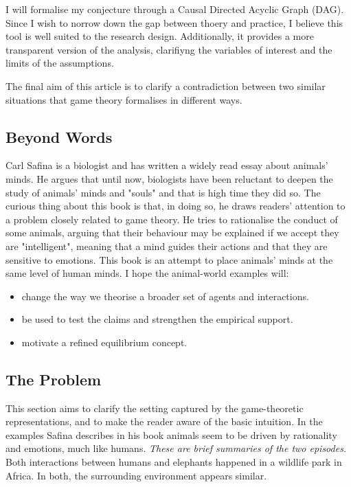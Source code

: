 \vspace*{1em}
I will formalise my conjecture through a Causal Directed Acyclic Graph (DAG). Since I wish to norrow down the gap between thoery and practice, I believe this tool is well suited to the research design. Additionally, it provides a more transparent version of the analysis, clarifiyng the variables of interest and the limits of the assumptions.

\vspace*{1em}
The final aim of this article is to clarify a contradiction between two similar situations that game theory formalises in different ways.


\subsection{Beyond Words}
Carl Safina is a biologist and has written a widely read essay \parencite{safinaWordsWhatAnimals2015} about animals' minds. He argues that until now, biologists have been reluctant to deepen the study of animals' minds and "souls" and that is high time they did so. The curious thing about this book is that, in doing so, he draws readers' attention to a problem closely related to game theory.
He tries to rationalise the conduct of some animals, arguing that their behaviour may be explained if we accept they are "intelligent", meaning that a mind guides their actions and that they are sensitive to emotions. This book is an attempt to place animals' minds at the same level of human minds.
I hope the animal-world examples will:

\begin{itemize}
  \item change the way we theorise a broader set of agents and interactions.
  \item be used to test the claims and strengthen the empirical support.
  \item motivate a refined equilibrium concept.
\end{itemize}

\subsection{The Problem} \label{sub:problem}
This section aims to clarify the setting captured by the game-theoretic representations, and to make the reader aware of the basic intuition.
In the examples Safina describes in his book \parencite{safinaWordsWhatAnimals2015} animals seem to be driven by rationality and emotions, much like humans. 
\textit{These are brief summaries of the two episodes.}
Both interactions between humans and elephants happened in a wildlife park in Africa. In both, the surrounding environment appears similar.

